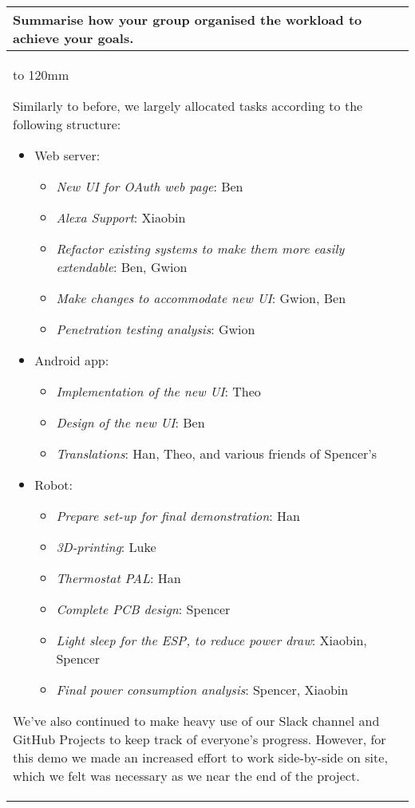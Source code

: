 \documentclass[a4paper]{article}
\newcommand{\colWidth}{141mm}
\begin{document}
\begin{center}
\begin{tabular}{|p{\colWidth}|}
	\hline
	\cellcolor{blue!25}\large
	\textbf{Summarise how your group organised the workload to achieve your goals.}
	\\ \hline
	\vtop to 120mm{
		Similarly to before, we largely allocated tasks according to the following structure:
		\begin{itemize}
			\item Web server:
			\begin{itemize}
				\item \textit{New UI for OAuth web page}: Ben
				\item \textit{Alexa Support}: Xiaobin
				\item \textit{Refactor existing systems to make them more easily extendable}: Ben, Gwion
				\item \textit{Make changes to accommodate new UI}: Gwion, Ben
				\item \textit{Penetration testing analysis}: Gwion
			\end{itemize}
			\item Android app:
			\begin{itemize}
				\item \textit{Implementation of the new UI}: Theo
				\item \textit{Design of the new UI}: Ben
				\item \textit{Translations}: Han, Theo, and various friends of Spencer's
			\end{itemize}
			\item Robot:
			\begin{itemize}
				\item \textit{Prepare set-up for final demonstration}: Han
				\item \textit{3D-printing}: Luke
				\item \textit{Thermostat PAL}: Han
				\item \textit{Complete PCB design}: Spencer
				\item \textit{Light sleep for the ESP, to reduce power draw}: Xiaobin, Spencer
				\item \textit{Final power consumption analysis}: Spencer, Xiaobin
			\end{itemize}
		\end{itemize}

		We've also continued to make heavy use of our Slack channel and GitHub Projects to keep track of
		everyone's progress. However, for this demo we made an increased effort to work side-by-side on site, which we felt was
		necessary as we near the end of the project.
  }
  \\
  \hline
\end{tabular}
\vskip 5mm


\end{center}
\end{document}
